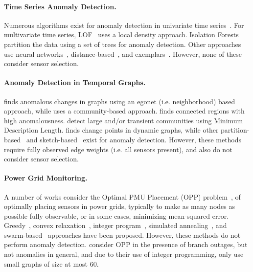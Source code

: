
\paragraph{Time Series Anomaly Detection.} Numerous algorithms exist for anomaly detection in univariate time series~\cite{keogh2007finding}. For multivariate time series, LOF~\cite{breunig2000lof} uses a local density approach. Isolation Forests~\cite{liu2008isolation} partition the data using a set of trees for anomaly detection. Other approaches use neural networks~\cite{yi2017grouped}, distance-based~\cite{ramaswamy2000efficient}, and exemplars~\cite{jones2014anomaly}. However, none of these consider sensor selection. 

\paragraph{Anomaly Detection in Temporal Graphs.} \cite{akoglu2010oddball} finds anomalous changes in graphs using an egonet (i.e. neighborhood) based approach, while \cite{chen2012community} uses a community-based approach. \cite{mongiovi2013netspot} finds connected regions with high anomalousness. \cite{araujo2014com2} detect large and/or transient communities using Minimum Description Length. \cite{akoglu2010event} finds change points in dynamic graphs, while other partition-based~\cite{aggarwal2011outlier} and sketch-based~\cite{ranshous2016scalable} exist for anomaly detection. However, these methods require fully observed edge weights (i.e. all sensors present), and also do not consider sensor selection. 

\paragraph{Power Grid Monitoring.} A number of works consider the Optimal PMU Placement (OPP) problem~\cite{brueni2005pmu}, of optimally placing sensors in power grids, typically to make as many nodes as possible fully observable, or in some cases, minimizing mean-squared error. Greedy~\cite{li2011phasor}, convex relaxation~\cite{kekatos2012optimal}, integer program~\cite{dua2008optimal}, simulated annealing~\cite{baldwin1993power}, and swarm-based~\cite{chakrabarti2008pmu} approaches have been proposed. However, these methods do not perform anomaly detection. \cite{rakpenthai2007optimal,zhao2012pmu,magnago1999unified} consider OPP in the presence of branch outages, but not anomalies in general, and due to their use of integer programming, only use small graphs of size at most 60. 

